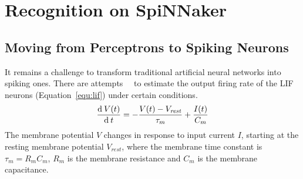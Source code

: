 \chapter{Recognition on SpiNNaker}
\label{cha:rsp}

\section{Moving from Perceptrons to Spiking Neurons}
It remains a challenge to transform traditional artificial neural networks into spiking ones.
There are attempts~\cite{la2008response}~\cite{burkitt2006review} to estimate the output firing rate of the LIF neurons (Equation~\ref{equ:lif}) under certain conditions. 
\begin{equation}
\frac{\mathrm{d} \: V(t)}{\mathrm{d}\:  t}=-\frac{V(t)-V_\mathit{rest}}{\tau_m}+\frac{I(t)}{C_m}
\label{equ:lif}
\end{equation}
The membrane potential $V$ changes in response to input current $I$, starting at the resting membrane potential  $V_{rest}$, where the membrane time constant is $\tau_m = R_mC_m$, $R_m$ is the membrane resistance and $C_m$ is the membrane capacitance.

